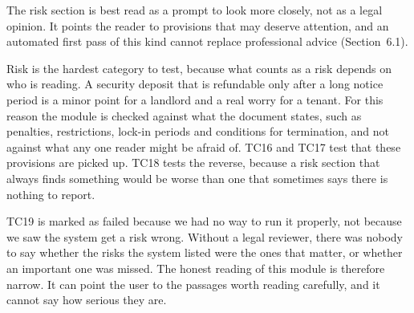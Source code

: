 \documentclass[12pt,a4paper,oneside]{report}
\begin{document}
The risk section is best read as a prompt to look more closely, not as a legal opinion. It points the reader to provisions that may deserve attention, and an automated first pass of this kind cannot replace professional advice (Section~6.1).

Risk is the hardest category to test, because what counts as a risk depends on who is reading. A security deposit that is refundable only after a long notice period is a minor point for a landlord and a real worry for a tenant. For this reason the module is checked against what the document states, such as penalties, restrictions, lock-in periods and conditions for termination, and not against what any one reader might be afraid of. TC16 and TC17 test that these provisions are picked up. TC18 tests the reverse, because a risk section that always finds something would be worse than one that sometimes says there is nothing to report.

TC19 is marked as failed because we had no way to run it properly, not because we saw the system get a risk wrong. Without a legal reviewer, there was nobody to say whether the risks the system listed were the ones that matter, or whether an important one was missed. The honest reading of this module is therefore narrow. It can point the user to the passages worth reading carefully, and it cannot say how serious they are.

\end{document}
